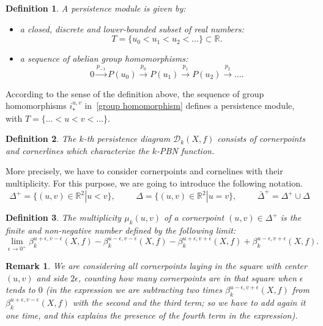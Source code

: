 \documentclass[english, LaM, oneside, noexaminfo]{sapthesis}
\newtheorem{oss}{\bf Remark}[section]
\newtheorem{defin}{\bf Definition}[section]
\begin{document}
\begin{defin} A \textit{persistence module} is given by:
\begin{itemize}
    \item a closed, discrete and lower-bounded subset of real numbers:
$$ T = \{u_0 < u_1 < u_2 <\dots\} \subset \mathbb{R}.$$
    \item a sequence of abelian group homomorphisms: $$0\xrightarrow{p_{-1}} P(u_0) \xrightarrow{p_0} P(u_1) \xrightarrow{p_1} P(u_2) \xrightarrow{p_2}\dots.$$
\end{itemize}
\end{defin}

According to the sense of the definition above, the sequence of group homomorphisms $i_*^{u,v}$ in~\cref{group homomorphism} defines a persistence module, with $T = \{\dots < u < v <\dots\}.$

\begin{defin} The \textit{$k$-th persistence diagram} $\mathcal{D}_k(X,f)$ consists of cornerpoints and cornerlines which characterize the $k$-PBN function.\end{defin}

More precisely, we have to consider cornerpoints and cornelines with their multiplicity. For this purpose, we are going to introduce the following notation.
$$\Delta^{+} =\{(u,v) \in \mathbb{R}^2 | u < v\}, \hspace{1cm} \Delta=\{(u,v) \in \mathbb{R}^2 | u = v\}, \hspace{1cm} \bar{\Delta}^{+}=\Delta^{+}  \cup \Delta $$

\begin{defin} The \textit{multiplicity} $\mu_{k}(u,v)$ of a cornerpoint $(u,v) \in \Delta^{+}$ is the finite and non-negative number defined by the following limit:
$$ \lim_{\epsilon \to 0^{+}} {\beta_{k}^{u+\epsilon,v-\epsilon}(X,f) - \beta_{k}^{u-\epsilon,v-\epsilon}(X,f) - \beta_{k}^{u+\epsilon,v+\epsilon}(X,f) + \beta_{k}^{u-\epsilon,v+\epsilon}(X,f) }. $$   \end{defin}

\begin{oss} We are considering all cornerpoints laying in the square with center $(u,v)$ and side $2\epsilon$, counting how many cornerpoints are in that square when $\epsilon$ tends to $0$ (in the expression we are subtracting two times $\beta_{k}^{u-\epsilon,v+\epsilon}(X,f)$ from $\beta_{k}^{u+\epsilon,v-\epsilon}(X,f)$ with the second and the third term; so we have to add again it one time, and this explains the presence of the fourth term in the expression). \end{oss}
\end{document}

